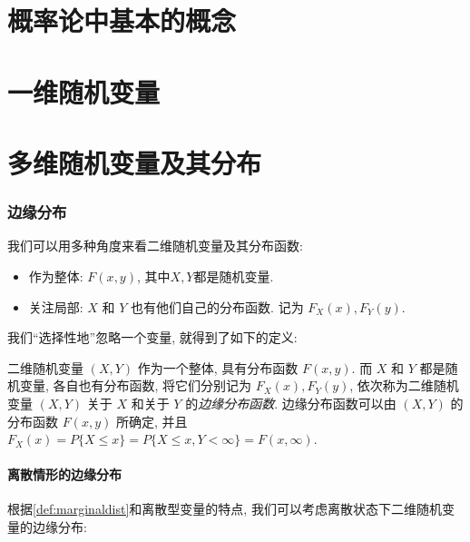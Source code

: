 
\usepackage{ctex}
\usepackage{pifont}
\usepackage{cleveref}



% 

\part{概率论中基本的概念}





\part{一维随机变量}





\part{多维随机变量及其分布}


\section{边缘分布}

我们可以用多种角度来看二维随机变量及其分布函数: 
\begin{itemize}
  \item 作为整体: $F(x, y)$, 其中$X,Y$都是随机变量.
  \item 关注局部: $X$ 和 $Y$ 也有他们自己的分布函数. 记为 $F_X(x), F_Y(y)$.
\end{itemize}

我们``选择性地''忽略一个变量, 就得到了如下的定义:
\begin{definition}[边缘分布]
  \label{def:marginaldist}
  二维随机变量 $(X, Y)$ 作为一个整体, 具有分布函数 $F(x, y)$. 而 $X$ 和 $Y$ 都是随机变量, 各自也有分布函数, 将它们分别记为 $F_X(x), F_Y(y)$, 依次称为二维随机变量 $(X, Y)$ 关于 $X$ 和关于 $Y$ 的\emph{边缘分布函数}. 边缘分布函数可以由 $(X, Y)$ 的分布函数 $F(x, y)$ 所确定, 并且$F_X(x)=P\{X \leqslant x\}=P\{X \leqslant x, Y<\infty\}=F(x, \infty)$.
\end{definition}

\subsection{离散情形的边缘分布}
根据\cref{def:marginaldist}和离散型变量的特点, 我们可以考虑离散状态下二维随机变量的边缘分布: 

